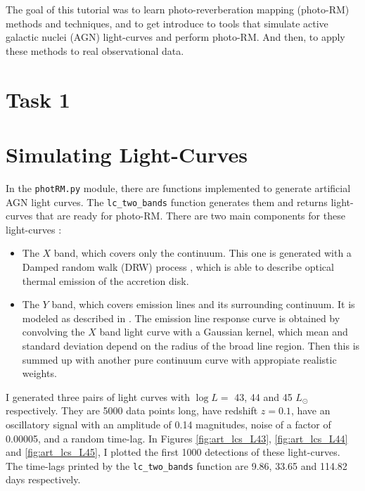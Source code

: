 \documentclass[letterpaper, oneside]{article}
\begin{document}
	
\templatePagecfg

The goal of this tutorial was to learn photo-reverberation mapping (photo-RM) methods and techniques, and to get introduce to tools that simulate active galactic nuclei (AGN) light-curves and perform photo-RM. And then, to apply these methods to real observational data.


\section*{Task 1}

\section{Simulating Light-Curves}

In the \texttt{photRM.py} module, there are functions implemented to generate artificial AGN light curves. The \texttt{lc\_two\_bands} function generates them and returns light-curves that are ready for photo-RM. There are two main components for these light-curves \cite{Kovacevic_2021, Kelly_2009}:
\begin{itemize}
	\item The $X$ band, which covers only the continuum. This one is generated with a Damped random walk (DRW) process %
	, which is able to describe optical thermal emission of the accretion disk.
	
	\item The $Y$ band, which covers emission lines and its surrounding continuum. It is modeled as described in \cite{Jankov_2022, Chelouche_Daniel_2012}. The emission line response curve is obtained by convolving the $X$ band light curve with a Gaussian kernel, which mean and standard deviation depend on the radius of the broad line region. Then this is summed up with another pure continuum curve with appropiate realistic weights.
\end{itemize}

I generated three pairs of light curves with $\log L = $ 43, 44 and 45 $L_{\odot}$ respectively. They are 5000 data points long, have redshift $z = 0.1$, have an oscillatory signal with an amplitude of 0.14 magnitudes, noise of a factor of 0.00005, and a random time-lag. In Figures \ref{fig:art_lcs_L43}, \ref{fig:art_lcs_L44} and \ref{fig:art_lcs_L45}, I plotted the first 1000 detections of these light-curves. The time-lags printed by the \texttt{lc\_two\_bands} function are 9.86, 33.65 and 114.82 days respectively.
\end{document}

